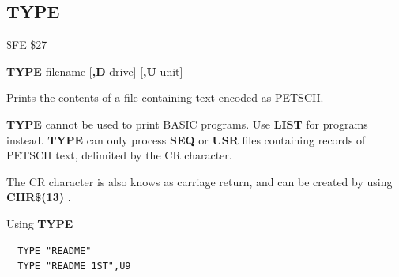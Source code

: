 
\newpage
\subsection{TYPE}
\begin{description}[leftmargin=2cm,style=nextline]
\item [Token:] \$FE \$27
\item [Format:] {\bf TYPE} filename [{\bf,D} drive] [{\bf,U} unit]
\item [Usage:] Prints the contents of a file containing
               text encoded as PETSCII.

   \filenamedefinition

   \drivedefinition

   \unitdefinition

\item [Remarks:] {\bf TYPE} cannot be used to print
                 BASIC programs. Use {\bf LIST} for programs instead.
                 {\bf TYPE} can only process {\bf SEQ} or {\bf USR} files
                 containing records of PETSCII text, delimited
                 by the CR character.

                 The CR character is also knows as carriage return, and can
                 be created by using {\bf CHR\$(13)} .

\item [Example:] Using {\bf TYPE}
\begin{tcolorbox}[colback=black,coltext=white]
\verbatimfont{\codefont}
\begin{verbatim}
  TYPE "README"
  TYPE "README 1ST",U9
\end{verbatim}
\end{tcolorbox}
\end{description}


\newpage
